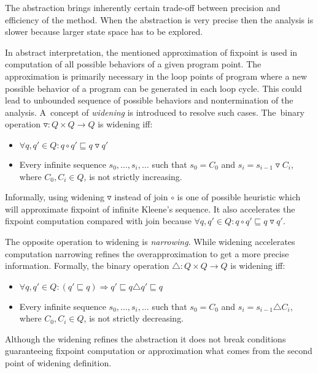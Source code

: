 \documentclass[a4paper, 12pt]{article}
\newcommand{\aord}[0]{\sqsubseteq}
\newcommand{\adom}[0]{Q}
\newcommand{\aitem}[0]{q}
\newcommand{\ajoin}[0]{\circ}
\newcommand{\wid}[0]{\triangledown}
\newcommand{\nar}[0]{\triangle}
\begin{document}
The abstraction brings inherently certain trade-off between
precision and efficiency of the method.
When the abstraction is very precise then the analysis
is slower because larger state space has to be explored.

In abstract interpretation, the mentioned approximation of fixpoint is
used in computation of all possible behaviors of a given program point.
The approximation is primarily necessary in the loop points of
program where a new possible behavior of a program can be generated
in each loop cycle.
This could lead to unbounded sequence of possible behaviors and
nontermination of the analysis.
A~concept of \emph{widening} is introduced to resolve such cases.
The~binary operation $\wid: \adom \times \adom \rightarrow \adom$ is widening iff:
\begin{itemize}
	\item $\forall \aitem, \aitem' \in \adom: \aitem \ajoin \aitem' \aord \aitem \wid \aitem'$
	\item Every infinite sequence $s_0, \ldots, s_i, \ldots$ such that
		$s_0 = C_0$ and $s_i = s_{i-1} \wid C_i$, where $C_0, C_i \in \adom$,
		is not strictly increasing.
\end{itemize}

Informally, using widening $\wid$ instead of join $\ajoin$ is one of possible heuristic
which will approximate fixpoint of infinite Kleene's sequence.
It also accelerates the fixpoint computation compared with join because
$\forall \aitem, \aitem' \in \adom: \aitem \ajoin \aitem' \aord \aitem \wid \aitem'$.

The opposite operation to widening is \emph{narrowing}.
While widening accelerates computation narrowing
refines the overapproximation to get a more precise information.
Formally, the binary operation $\nar: \adom \times \adom \rightarrow \adom$
is widening iff:
\begin{itemize}
	\item $\forall \aitem, \aitem' \in \adom: (\aitem' \aord \aitem) \Rightarrow \aitem' \aord \aitem \nar \aitem' \aord \aitem$
	\item Every infinite sequence $s_0, \ldots, s_i, \ldots$ such that
		$s_0 = C_0$ and $s_i = s_{i-1} \nar C_i$, where $C_0, C_i \in \adom$,
		is not strictly decreasing.
\end{itemize}

Although the widening refines the abstraction it does not
break conditions guaranteeing fixpoint computation or approximation
what comes from the second point of widening definition.
\end{document}
